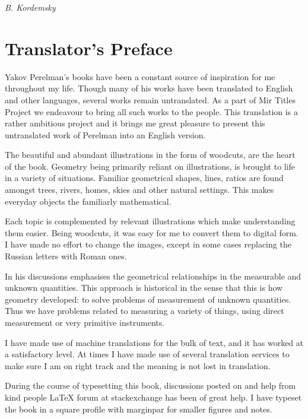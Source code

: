 \begin{flushright}
\emph{B. Kordemsky}
\end{flushright}


\chapter{Translator's Preface}
\label{translator-preface}

Yakov Perelman's books have been a constant source of inspiration for me throughout my life. Though many of his works have been translated to English and other languages, several works remain untranslated. As a part of Mir Titles Project we endeavour to bring all such works to the people. This translation is a rather ambitious project and it brings me great pleasure to present this untranslated work of Perelman into an English version. 

The beautiful and abundant illustrations in the form of woodcuts, are the heart of the book. Geometry being primarily reliant on illustrations, is brought to life in a variety of situations. Familiar geometrical shapes, lines, ratios are found amongst trees, rivers, homes, skies and other natural settings. This makes everyday objects the familiarly mathematical. 

Each topic is complemented by relevant illustrations which make understanding them easier. Being woodcuts, it was easy for me to convert them to digital form. I have made no effort to change the images, except in some cases replacing the Russian letters with Roman ones.


In his discussions emphasises the geometrical relationships in the measurable and unknown quantities. This approach is historical in the sense that this is how geometry developed: to solve problems of measurement of unknown quantities. Thus we have problems related to measuring a variety of things, using direct measurement or very primitive instruments. 



I have made use of machine translations for the bulk of text, and it has worked at a satisfactory level. At times I have made use of several translation services to make sure I am on right track and the meaning is not lost in translation. 

During the course of typesetting this book, discussions posted on and help from kind people \LaTeX{} forum at stackexchange has been of great help. I have typeset the book in a square profile with marginpar for smaller figures and notes. 

